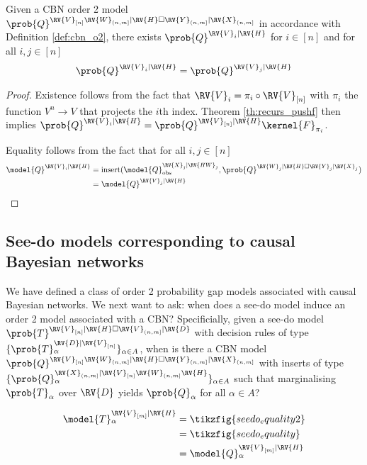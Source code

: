 \begin{theorem}
Given a CBN order 2 model $\prob{Q}^{\RV{V}_{[n]}\RV{W}_{(n,m]}|\RV{H}\square \RV{Y}_{(n,m]}|\RV{X}_{(n,m]}}$ in accordance with Definition \ref{def:cbn_o2}, there exists $\prob{Q}^{\RV{V}_{i}|\RV{H}}$ for $i\in [n]$ and for all $i,j\in [n]$
\begin{align}
    \prob{Q}^{\RV{V}_i|\RV{H}} = \prob{Q}^{\RV{V}_j|\RV{H}}\label{eq:identical_3}
\end{align}
\end{theorem}

\begin{proof}
Existence follows from the fact that $\RV{V}_i=\pi_i\circ\RV{V}_{[n]}$ with $\pi_i$ the function $V^n\to V$ that projects the $i$th index. Theorem \ref{th:recurs_pushf} then implies $\prob{Q}^{\RV{V}_i|\RV{H}}=\prob{Q}^{\RV{V}_{[n]}|\RV{H}}\kernel{F}_{\pi_i}$.

Equality follows from the fact that for all $i,j\in[n]$
\begin{align}
    \model{Q}^{\RV{V}_i|\RV{H}} &= \text{insert}(\model{Q}_{\text{obs}}^{\RV{X}_{j}|\RV{HW}_{j}},\prob{Q}^{\RV{W}_{j}|\RV{H}\square\RV{Y}_{j}|\RV{X}_{j}})\\
    &= \model{Q}^{\RV{V}_j|\RV{H}}
\end{align}
\end{proof}

\subsection{See-do models corresponding to causal Bayesian networks}

We have defined a class of order 2 probability gap models associated with causal Bayesian networks. We next want to ask: when does a see-do model induce an order 2 model associated with a CBN? Specificially, given a see-do model $\prob{T}^{\RV{V}_{[n]}|\RV{H}\square \RV{V}_{(n,m]}|\RV{D}}$ with decision rules of type $\{\prob{T}_\alpha^{\RV{D}|\RV{V}_{[n]}}\}_{\alpha\in A}$, when is there a CBN model $\prob{Q}^{\RV{V}_{[n]}\RV{W}_{(n,m]}|\RV{H}\square \RV{Y}_{(n,m]}|\RV{X}_{(n,m]}}$ with inserts of type $\{\prob{Q}_\alpha^{\RV{X}_{(n,m]}|\RV{V}_{[n]}\RV{W}_{(n,m]}\RV{H}}\}_{\alpha\in A}$ such that marginalising $\prob{T}_\alpha$ over $\RV{D}$ yields $\prob{Q}_\alpha$ for all $\alpha\in A$?

\begin{align}
    \model{T}^{\RV{V}_{[m]}|\RV{H}}_\alpha&=\tikzfig{seedo_equality2}\\
    &=\tikzfig{seedo_equality} \label{eq:consistent}\\
    &= \model{Q}^{\RV{V}_{[m]}|\RV{H}}_\alpha
\end{align}

